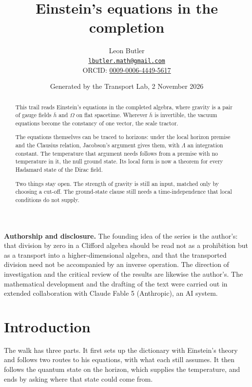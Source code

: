 \documentclass[11pt]{article}
\title{\bfseries Einstein's equations in the completion}
\author{Leon Butler\\ \normalsize\href{mailto:lbutler.math@gmail.com}{\texttt{lbutler.math@gmail.com}}\\ \normalsize ORCID: \href{https://orcid.org/0009-0006-4449-5617}{0009-0006-4449-5617}}
\date{Generated by the Transport Lab, 2 November 2026}
\theoremstyle{definition}
\theoremstyle{plain}
\providecommand{\hb}{}\renewcommand{\hb}{\bar{h}}
\begin{document}
\maketitle
\begin{abstract}
\normalsize
This trail reads Einstein's equations in the completed algebra, where gravity is a pair of gauge fields $\hb$ and $\Omega$ on flat spacetime. Wherever $\hb$ is invertible, the vacuum equations become the constancy of one vector, the scale tractor.

The equations themselves can be traced to horizons: under the local horizon premise and the Clausius relation, Jacobson's argument gives them, with $\Lambda$ an integration constant. The temperature that argument needs follows from a premise with no temperature in it, the null ground state. Its local form is now a theorem for every Hadamard state of the Dirac field.

Two things stay open. The strength of gravity is still an input, matched only by choosing a cut-off. The ground-state clause still needs a time-independence that local conditions do not supply.
\end{abstract}
\newpage
\noindent \textbf{Authorship and disclosure. }The founding idea of the series is the author's: that division by zero in a Clifford algebra should be read not as a prohibition but as a transport into a higher-dimensional algebra, and that the transported division need not be accompanied by an inverse operation. The direction of investigation and the critical review of the results are likewise the author's. The mathematical development and the drafting of the text were carried out in extended collaboration with Claude Fable 5 (Anthropic), an AI system.

\noindent{}
\newpage

\section*{Introduction}
The walk has three parts. It first sets up the dictionary with Einstein's theory and follows two routes to his equations, with what each still assumes. It then follows the quantum state on the horizon, which supplies the temperature, and ends by asking where that state could come from.
\end{document}
